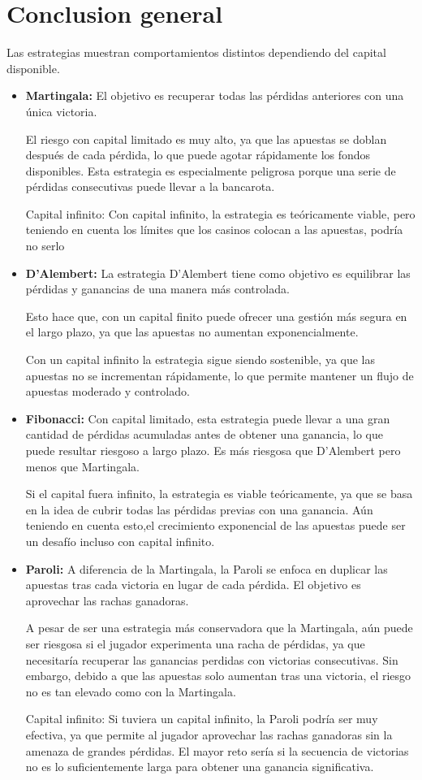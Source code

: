 \documentclass{article}
\begin{document}
\section{Conclusion general}
Las estrategias muestran comportamientos distintos dependiendo del capital disponible. 
\begin{itemize}

\item \textbf{Martingala: }
El objetivo es recuperar todas las pérdidas anteriores con una única victoria.

El riesgo con capital limitado es muy alto, ya que las apuestas se doblan después de cada pérdida, lo que puede agotar rápidamente los fondos disponibles. Esta estrategia es especialmente peligrosa porque una serie de pérdidas consecutivas puede llevar a la bancarota.

Capital infinito: Con capital infinito, la estrategia es teóricamente viable, pero teniendo en cuenta los límites que los casinos colocan a las apuestas, podría no serlo

\item \textbf{D'Alembert:} La estrategia D'Alembert tiene como objetivo es equilibrar las pérdidas y ganancias de una manera más controlada.

Esto hace que, con un capital finito puede ofrecer una gestión más segura en el largo plazo, ya que las apuestas no aumentan exponencialmente.

Con un capital infinito  la estrategia sigue siendo sostenible, ya que las apuestas no se incrementan rápidamente, lo que permite mantener un flujo de apuestas moderado y controlado.
\item \textbf{Fibonacci: }
Con capital limitado, esta estrategia puede llevar a una gran cantidad de pérdidas acumuladas antes de obtener una ganancia, lo que puede resultar riesgoso a largo plazo. Es más riesgosa que D'Alembert pero menos que Martingala.

Si el capital fuera infinito, la estrategia es viable teóricamente, ya que se basa en la idea de cubrir todas las pérdidas previas con una ganancia. Aún teniendo en cuenta esto,el crecimiento exponencial de las apuestas puede ser un desafío incluso con capital infinito.

\item \textbf{Paroli: }
A diferencia de la Martingala, la Paroli se enfoca en duplicar las apuestas tras cada victoria en lugar de cada pérdida. El objetivo es aprovechar las rachas ganadoras.

A pesar de ser una estrategia más conservadora que la Martingala, aún puede ser riesgosa si el jugador experimenta una racha de pérdidas, ya que necesitaría recuperar las ganancias perdidas con victorias consecutivas. Sin embargo, debido a que las apuestas solo aumentan tras una victoria, el riesgo no es tan elevado como con la Martingala.

Capital infinito: Si tuviera un capital infinito, la Paroli podría ser muy efectiva, ya que permite al jugador aprovechar las rachas ganadoras sin la amenaza de grandes pérdidas. El mayor reto sería si la secuencia de victorias no es lo suficientemente larga para obtener una ganancia significativa.
\end{itemize}
\end{document}
